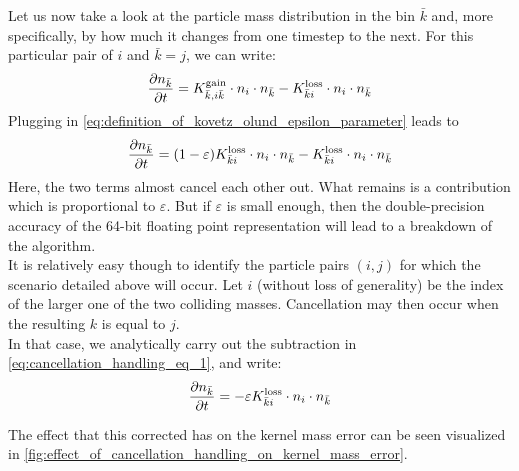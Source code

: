         Let us now take a look at the particle mass distribution in the bin $\bar k$ and, more 
        specifically, by how much it changes from one timestep to the next. For this particular 
        pair of $i$ and $\bar k=j$, we can write:
        \begin{equation}
            \frac{\partial n_{\bar k}}{\partial t}
                =K_{\bar k,i\bar k}^{\text{gain}}\cdot n_i\cdot n_{\bar k}
                -K_{\bar ki}^{\text{loss}}\cdot n_i\cdot n_{\bar k}
        \end{equation}
        Plugging in \cref{eq:definition_of_kovetz_olund_epsilon_parameter} leads to
        \begin{equation}
            \label{eq:cancellation_handling_eq_1}
            \frac{\partial n_{\bar k}}{\partial t}
                =(1-\varepsilon)K_{\bar ki}^{\text{loss}}\cdot n_i\cdot n_{\bar k}
                -K_{\bar ki}^{\text{loss}}\cdot n_i\cdot n_{\bar k}
        \end{equation}
        Here, the two terms almost cancel each other out. What remains is a contribution which is 
        proportional to $\varepsilon$. But if $\varepsilon$ is small enough, then the 
        double-precision accuracy of the 64-bit floating point representation will lead to a
        breakdown of the algorithm. \\
        
        It is relatively easy though to identify the particle pairs $(i,j)$ for which the scenario 
        detailed above will occur. Let $i$ (without loss of generality) be the index of the larger 
        one of the two colliding masses. Cancellation may then occur when the resulting $k$ is 
        equal to $j$.\\
        
        In that case, we analytically carry out the subtraction in 
        \cref{eq:cancellation_handling_eq_1}, and write:
        \begin{equation}
            \frac{\partial n_{\bar k}}{\partial t}
                = -\varepsilon K_{\bar ki}^{\text{loss}}\cdot n_i\cdot n_{\bar k}
        \end{equation}


        The effect that this corrected has on the kernel mass error can be seen visualized 
        in \cref{fig:effect_of_cancellation_handling_on_kernel_mass_error}.


